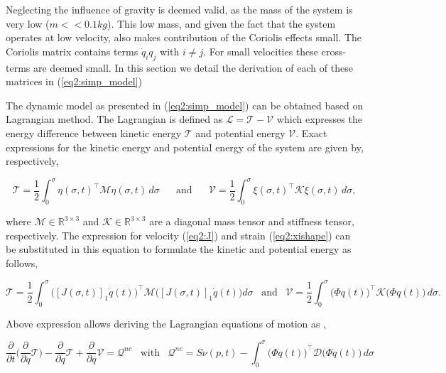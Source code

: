 Neglecting the influence of gravity is deemed valid, as the mass of the system is very low ($m << 0.1 kg$). This low mass, and given the fact that the system operates at low velocity, also makes contribution of the Coriolis effects small. The Coriolis matrix contains terms $\dot{q}_i q_j$ with $i \neq j$. For small velocities these cross-terms are deemed small. In this section we detail the derivation of each of these matrices in (\ref{eq2:simp_model})

The dynamic model as presented in (\ref{eq2:simp_model}) can be obtained based on Lagrangian method. The Lagrangian is defined as $\mathcal{L} = \mathcal{T} -\mathcal{V}$ which expresses the energy difference between kinetic energy $\mathcal{T}$ and potential energy $\mathcal{V}$. Exact expressions for the kinetic energy and potential energy of the system are given by, respectively,

\begin{equation}
    \mathcal{T} = \frac{1}{2}\int_0^{\sigma} \eta(\sigma,t)^\top \mathcal{M} \eta(\sigma,t) \hspace{2pt} d \sigma \hspace{20pt} \text{and} \hspace{20pt}  \mathcal{V} = \frac{1}{2}\int_0^{\sigma} \xi(\sigma,t)^\top \mathcal{K} \xi(\sigma,t)  \hspace{2pt} d \sigma,
    \label{eq2:T}
\end{equation}


where $\mathcal{M} \in \mathbb{R}^{3\times3}$ and $\mathcal{K} \in \mathbb{R}^{3\times3}$ are a diagonal mass tensor and stiffness tensor, respectively. The expression for velocity (\ref{eq2:J}) and strain (\ref{eq2:xishape}) can be substituted in this equation to formulate the kinetic and potential energy as follows,

\begin{equation}
    \mathcal{T} = \frac{1}{2}\int_0^{\sigma} \Big([J(\sigma,t)]_1\dot{q}(t)\Big)^\top \mathcal{M} \Big([J(\sigma,t)]_1\dot{q}(t)\Big) d \sigma  \hspace{10pt} \text{and} \hspace{10pt}  \mathcal{V} = \frac{1}{2}\int_0^{\sigma} \big(\Phi q(t)\big)^\top \mathcal{K} \big(\Phi q(t)\big) \hspace{2pt} d \sigma.
\end{equation}

Above expression allows deriving the Lagrangian equations of motion as \cite{NWouw},

\begin{equation}
    \frac{\partial}{\partial t}\Big( \frac{\partial}{\partial\dot{q}}\mathcal{T}\Big)- \frac{\partial}{\partial q}\mathcal{T} + \frac{\partial}{\partial q}\mathcal{V} = \mathcal{Q}^{nc} \hspace{10pt} \text{with} \hspace{10pt} \mathcal{Q}^{nc} =  S\nu(p,t) - \int_0^\sigma \big(\Phi\dot{q}(t)\big)^\top \mathcal{D} \big( \Phi \dot{q}(t)\big) \hspace{2pt} d \sigma
    \label{eq2:lagrange}
\end{equation}

